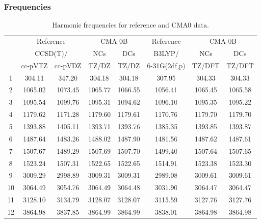 \documentclass[10pt,oneside]{article}
\begin{document}
\clearpage

\subsubsection*{Frequencies}
\begin{table}[h!]
\centering
\caption{Harmonic frequencies for reference and CMA0 data.}
\begin{tabular}{cccccccc}
\toprule
{} & \multicolumn{2}{c}{Reference} & \multicolumn{2}{c}{CMA-0B} &    Reference & \multicolumn{2}{c}{CMA-0B} \\
{} & \multicolumn{2}{c}{CCSD(T)/} &     NCs &     DCs &       B3LYP/ &     NCs &     DCs \\
{} &   cc-pVTZ & cc-pVDZ &   TZ/DZ &   TZ/DZ & 6-31G(2df,p) &  TZ/DFT &  TZ/DFT \\
\midrule
1  &    304.11 &  347.20 &  304.18 &  304.18 &       307.95 &  304.33 &  304.33 \\
2  &   1065.02 & 1073.45 & 1065.77 & 1066.55 &      1056.41 & 1065.45 & 1065.58 \\
3  &   1095.54 & 1099.76 & 1095.31 & 1094.62 &      1096.10 & 1095.35 & 1095.22 \\
4  &   1179.62 & 1171.28 & 1179.60 & 1179.61 &      1170.76 & 1179.70 & 1179.70 \\
5  &   1393.88 & 1405.11 & 1393.71 & 1393.76 &      1385.35 & 1393.85 & 1393.87 \\
6  &   1487.64 & 1483.26 & 1488.02 & 1487.90 &      1481.56 & 1487.62 & 1487.61 \\
7  &   1507.67 & 1489.29 & 1507.69 & 1507.70 &      1499.40 & 1507.64 & 1507.65 \\
8  &   1523.24 & 1507.31 & 1522.65 & 1522.65 &      1514.91 & 1523.38 & 1523.30 \\
9  &   3009.29 & 2998.89 & 3009.31 & 3009.31 &      2989.08 & 3009.61 & 3009.61 \\
10 &   3064.49 & 3054.76 & 3064.49 & 3064.48 &      3031.90 & 3064.47 & 3064.47 \\
11 &   3128.10 & 3134.79 & 3128.07 & 3128.07 &      3115.59 & 3127.76 & 3127.76 \\
12 &   3864.98 & 3837.85 & 3864.99 & 3864.99 &      3838.01 & 3864.98 & 3864.98 \\
\bottomrule
\end{tabular}
\end{table}

\clearpage
\end{document}
